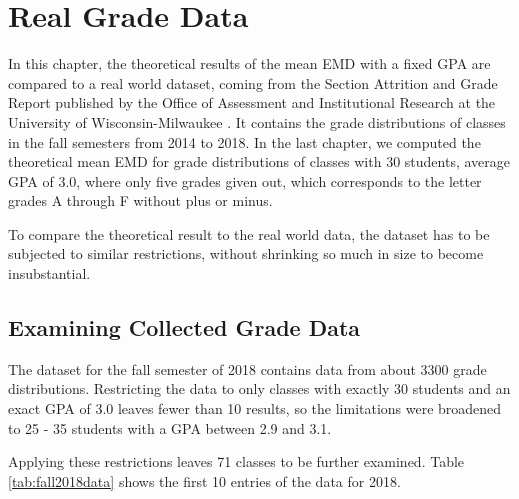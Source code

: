 \documentclass[12pt,letterpaper,oneside,openany]{book}
\begin{document}
\chapter{Real Grade Data}
In this chapter, the theoretical results of the mean EMD with a fixed GPA are compared to  a real world dataset, coming from the Section Attrition and Grade Report published by the Office of Assessment and Institutional Research at the University of Wisconsin-Milwaukee \cite{gradeData}. It contains the grade distributions of classes in the fall semesters from 2014 to 2018.
In the last chapter, we computed the theoretical mean EMD for grade distributions of classes with 30 students, average GPA of 3.0, where only five  grades given out, which corresponds to the letter grades A through F without plus or minus.

To compare the theoretical result to the real world data, the dataset has to be subjected to similar restrictions, without shrinking so much in size to become insubstantial.


\setcounter{section}{0}
\section{Examining Collected Grade Data}
The dataset for the fall semester of 2018 contains data from about 3300 grade distributions. Restricting the data to only classes with exactly 30 students and an exact GPA of 3.0 leaves fewer than 10 results, so the limitations were broadened to 25 - 35 students with a GPA between 2.9 and 3.1. 

Applying these restrictions leaves 71 classes to be further examined. 
Table \ref{tab:fall2018data} shows the first 10 entries of the data for 2018.
\end{document}
